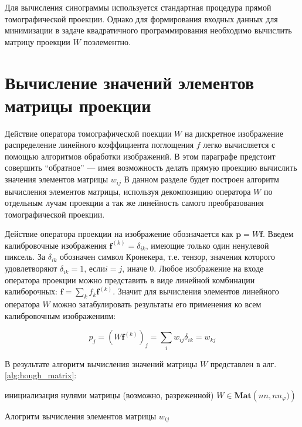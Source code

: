 Для вычисления синограммы используется стандартная процедура прямой томографической проекции.
Однако для формирования входных данных для минимизации в задаче квадратичного программирования необходимо вычислить матрицу проекции $W$ поэлементно.

\section{Вычисление значений элементов матрицы проекции}

Действие оператора томографической поекции $W$ на дискретное изображение распределение линейного коэффициента поглощения $f$ легко вычисляется с помощью алгоритмов обработки изображений.
В этом параграфе  предстоит совершить ``обратное'' --- имея возможность делать прямую проекцию вычислить значения элементов матрицы $w_{ij}$
В данном разделе будет построен алгоритм вычисления элементов матрицы, используя декомпозицию оператора $W$ по отдельным лучам проекции а так же линейность самого преобразования томографической проекции.

Действие оператора проекции на изображение обозначается как $\mathbf{p} = W\mathbf{f}$.
Введем калибровочные изображения $\mathbf{f}^{(k)} = \delta_{ik}$, имеющие только один ненулевой пиксель.
За $\delta_{ik}$ обозначен символ Кронекера, т.е. тензор, значения которого удовлетворяют $\delta_{ik} = 1 \text{, если} i = j \text{, иначе } 0$.
Любое изображение на входе оператора проекции можно представить в виде линейной комбинации калиборочных: $\mathbf{f} = \sum_k f_k \mathbf{f}^{(k)}$.
Значит для вычисления элементов линейного оператора $W$ можно затабулировать результаты его применения ко всем калибровочным изображениям:

\begin{equation}
  \label{eq:w_on_calib_img}
  p_j = \left(W \mathbf{f}^{(k)} \right)_j = \sum_i w_{ij} \delta_{ik} = w_{kj}
\end{equation}

В результате алгоритм вычисления значений матрицы $W$ представлен в алг. \ref{alg:hough_matrix}:

\begin{algorithm}[H]
 инициализация нулями матрицы (возможно, разреженной) $W \in \textbf{Mat}\left(nn, nn_\varphi)\right)$\;
 \caption{Алогритм вычисления элементов матрицы $w_{ij}$}
 \label{alg:hough_matrix}
\end{algorithm}

